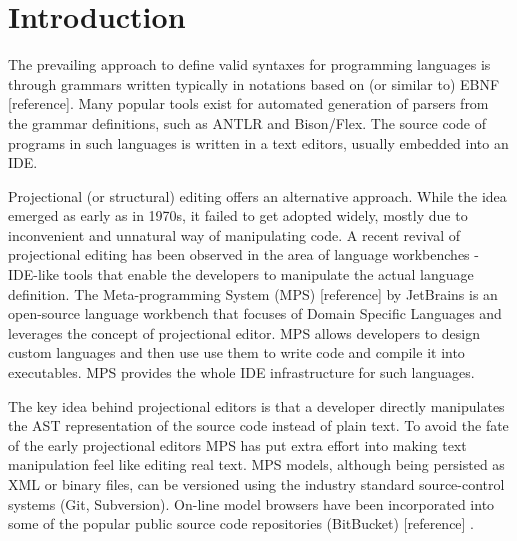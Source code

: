 \section{Introduction}

 The prevailing approach to define valid syntaxes for programming languages is through grammars written typically in notations based on (or similar to) EBNF [reference]. Many popular tools exist for automated generation of parsers from the grammar definitions, such as ANTLR and Bison/Flex. The source code of programs in such languages is written in a text editors, usually embedded into an IDE.

 Projectional (or structural) editing offers an alternative approach. While the idea emerged as early as in 1970s, it failed to get adopted widely, mostly due to inconvenient and unnatural way of manipulating code.  A recent revival of projectional editing has been observed in the area of language workbenches - IDE-like tools that enable the developers to manipulate the actual language definition. The Meta-programming System (MPS) [reference] by JetBrains is an open-source language workbench that focuses of Domain Specific Languages and leverages the concept of projectional editor. MPS allows developers to design custom languages and then use use them to write code and compile it into executables. MPS provides the whole IDE infrastructure for such languages.

 The key idea behind projectional editors is that a developer directly manipulates the AST representation of the source code instead of plain text. To avoid the fate of the early projectional editors MPS has put extra effort into making text manipulation feel like editing real text. MPS models, although being persisted as XML or binary files, can be versioned using the industry standard source-control systems (Git, Subversion). On-line model browsers have been incorporated into some of the popular public source code repositories (BitBucket) [reference] .

